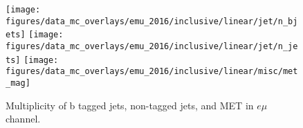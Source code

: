 \begin{figure}[htb!]
    \centering
    \texttt{[image: figures/data\_mc\_overlays/emu\_2016/inclusive/linear/jet/n\_bjets]}
    \texttt{[image: figures/data\_mc\_overlays/emu\_2016/inclusive/linear/jet/n\_jets]}
    \texttt{[image: figures/data\_mc\_overlays/emu\_2016/inclusive/linear/misc/met\_mag]}
    \caption{Multiplicity of b tagged jets, non-tagged jets, and MET in
    $e\mu$ channel.}
    \label{fig:emu_jetmet}
\end{figure}

